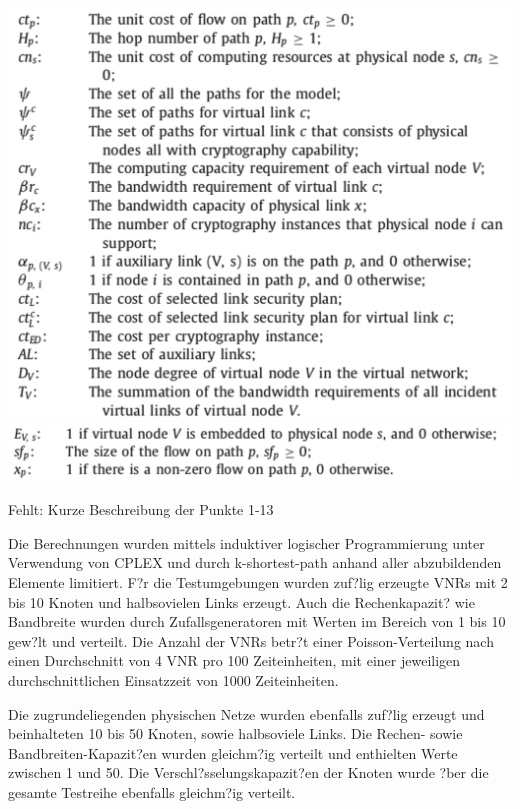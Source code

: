 \documentclass{lni}
\begin{document}
\begin{center}
	\includegraphics[width=1\textwidth]{notations.pdf}\newline
	\newline
	\includegraphics[width=1\textwidth]{variables.pdf}\newline
\end{center}

Fehlt: Kurze Beschreibung der Punkte 1-13\newline

Die Berechnungen wurden mittels induktiver logischer Programmierung unter Verwendung von CPLEX\cite{CPLEX} und durch k-shortest-path anhand aller abzubildenden Elemente limitiert.
F?r die Testumgebungen wurden zuf?lig erzeugte VNRs mit 2 bis 10 Knoten und halbsovielen Links erzeugt. Auch die Rechenkapazit? wie Bandbreite wurden durch Zufallsgeneratoren mit Werten im Bereich von 1 bis 10 gew?lt und verteilt. Die Anzahl der VNRs betr?t einer Poisson-Verteilung nach einen Durchschnitt von 4 VNR pro 100 Zeiteinheiten, mit einer jeweiligen durchschnittlichen Einsatzzeit von 1000 Zeiteinheiten.

Die zugrundeliegenden physischen Netze wurden ebenfalls zuf?lig erzeugt und beinhalteten 10 bis 50 Knoten, sowie halbsoviele Links. Die Rechen- sowie Bandbreiten-Kapazit?en wurden gleichm?ig verteilt und enthielten Werte zwischen 1 und 50. Die Verschl?sselungskapazit?en der Knoten  wurde ?ber die gesamte Testreihe ebenfalls gleichm?ig verteilt.
\end{document}
